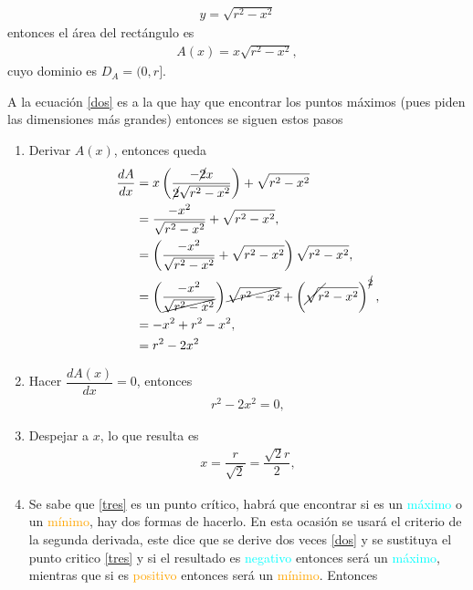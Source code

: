 \documentclass[legalpaper, 12pt]{exam}
\newcommand{\cancelroot}[1]{%
  \sbox0{$\displaystyle\sqrt{\vphantom{#1}}$}%
  \cancel{\phantom{\usebox0}\hspace{0.5em}}\hspace{\dimexpr-\wd0-0.5em}%
  \sqrt{#1}%
}
\begin{document}
\begin{questions}
\begin{solution}
\begin{multicols}{2}
\begin{align*}
y = \sqrt{r^2 - x^2}
\end{align*}
entonces el área del rectángulo es
\begin{align}
A(x) = x\sqrt{r^2 - x^2},\label{dos}
\end{align}
cuyo dominio es $D_A = (0,r]$.\vspace*{0.5cm}
\end{multicols}
A la ecuación \eqref{dos} es a la que hay que encontrar los puntos máximos (pues piden las dimensiones más grandes) entonces se siguen estos pasos
\begin{enumerate}
    \item Derivar $A(x)$, entonces queda
            \begin{align*}
            \dfrac{dA}{dx} &= x\left(\dfrac{-\cancel{2}x}{\cancel{2}\sqrt{r^2 - x^2}}\right) + \sqrt{r^2 - x^2}\\
                           &= \dfrac{-x^2}{\sqrt{r^2 - x^2}} + \sqrt{r^2 - x^2},\\
                           &= \left(\dfrac{-x^2}{\sqrt{r^2 - x^2}} + \sqrt{r^2 - x^2}\right)\sqrt{r^2 - x^2},\\
                           &= \left(\dfrac{-x^2}{\cancel{\sqrt{r^2 - x^2}}}\right)\cancel{\sqrt{r^2 - x^2}} + \left(\cancelroot{r^2 - x^2}\right)^{\cancel{2}},\\
                           &= -x^2 + r^2 - x^2,\\
                           &= r^2 - 2x^2
            \end{align*}
    \item Hacer $\dfrac{dA(x)}{dx} = 0$, entonces
            \begin{align*}
            r^2 - 2x^2 = 0,
            \end{align*}
    \item Despejar a $x$, lo que resulta es
            \begin{align}
            x = \dfrac{r}{\sqrt{2}} = \dfrac{\sqrt{2}r}{2},\label{tres}
            \end{align}
    \item Se sabe que \eqref{tres} es un punto crítico, habrá que encontrar si es un \textcolor{cyan}{máximo} o un \textcolor{orange}{mínimo}, hay dos formas de hacerlo. En esta ocasión se usará el criterio de la segunda derivada, este dice que se derive dos veces \eqref{dos} y se sustituya el punto critico \eqref{tres} y si el resultado es \textcolor{cyan}{negativo} entonces será un \textcolor{cyan}{máximo}, mientras que si es \textcolor{orange}{positivo} entonces será un \textcolor{orange}{mínimo}. Entonces

\end{enumerate}
\end{solution}
\end{questions}
\end{document}
